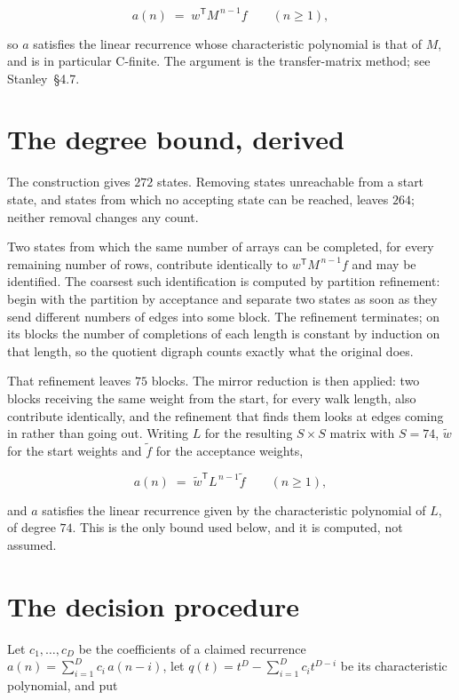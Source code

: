 \documentclass[11pt]{article}
\theoremstyle{definition}
\begin{document}
\[a(n) \;=\; w^{\mathsf T} M^{\,n-1} f \qquad (n \ge 1),\]

so $a$ satisfies the linear recurrence whose characteristic polynomial is that of $M$, and is in particular C-finite. The argument is the transfer-matrix method; see Stanley~\S4.7.

\section{The degree bound, derived}

The construction gives $272$ states. Removing states unreachable from a start state, and states from which no accepting state can be reached, leaves $264$; neither removal changes any count.

Two states from which the same number of arrays can be completed, for every remaining number of rows, contribute identically to $w^{\mathsf T}M^{\,n-1}f$ and may be identified. The coarsest such identification is computed by partition refinement: begin with the partition by acceptance and separate two states as soon as they send different numbers of edges into some block. The refinement terminates; on its blocks the number of completions of each length is constant by induction on that length, so the quotient digraph counts exactly what the original does.

That refinement leaves $75$ blocks. The mirror reduction is then applied: two blocks receiving the same weight from the start, for every walk length, also contribute identically, and the refinement that finds them looks at edges coming in rather than going out. Writing $L$ for the resulting $S \times S$ matrix with $S = 74$, $\tilde w$ for the start weights and $\tilde f$ for the acceptance weights,

\[a(n) \;=\; \tilde w^{\mathsf T} L^{\,n-1} \tilde f \qquad (n \ge 1),\]

and $a$ satisfies the linear recurrence given by the characteristic polynomial of $L$, of degree $74$. This is the only bound used below, and it is computed, not assumed.

\section{The decision procedure}

Let $c_1,\dots,c_D$ be the coefficients of a claimed recurrence $a(n) = \sum_{i=1}^{D} c_i\,a(n-i)$, let $q(t) = t^{D} - \sum_{i=1}^{D} c_i t^{D-i}$ be its characteristic polynomial, and put
\end{document}
